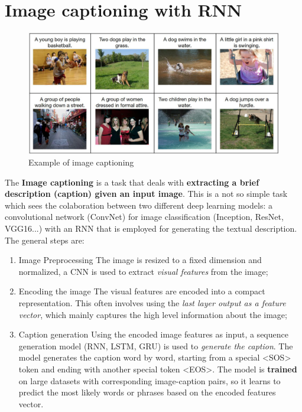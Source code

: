 \section{Image captioning with RNN}
\begin{figure}
    \centering
    \includegraphics[scale=0.28]{img/img_caption.jpg}
    \caption{Example of image captioning}
\end{figure}
The \textbf{Image captioning} is a task that deals with \textbf{extracting a brief description (caption) given an input image}. This is a not so simple task which sees the colaboration between two different deep learning models: a convolutional network (ConvNet) for image classification (Inception, ResNet, VGG16...) with an RNN that is employed for generating the textual description. The general steps are: 
\begin{enumerate}
    \itemsep-0.2em
    \item \textsf{Image Preprocessing} The image is resized to a fixed dimension and normalized, a CNN is used to extract \textit{visual features} from the image;
    \item \textsf{Encoding the image} The visual features are encoded into a compact representation. This often involves using the \textit{last layer output as a feature vector}, which mainly captures the high level information about the image; 
    \item \textsf{Caption generation} Using the encoded image features as input, a sequence generation model (RNN, LSTM, GRU) is used to \textit{generate the caption}. The model generates the caption word by word, starting from a special <SOS> token and ending with another special token <EOS>. The model is  \textbf{trained} on large datasets with corresponding image-caption pairs, so it learns to predict the most likely words or phrases based on the encoded features vector.
\end{enumerate}


